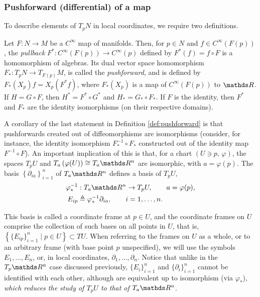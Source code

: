\subsubsection{Pushforward (differential) of a map}
To describe elements of $T_pN$ in local coordinates, we require two definitions.

\begin{defn}\label{def:pushforward}
Let $F:N\rightarrow M$ be a $C^{\infty}$ map of manifolds. Then, for $p\in N$ and $f\in C^{\infty}(F(p))$, the \textit{pullback} $F^*:C^{\infty}(F(p))\rightarrow C^{\infty}(p)$ defined by $F^*(f) = f\circ F$ is a homomorphism of algebras. Its dual vector space homomorphism $F_*:T_pN \rightarrow T_{F(p)}M$, is called the \textit{pushforward}, and is defined by $F_*(X_p)f = X_p(F^*f)$, where $F_*(X_p)$ is a map of $C^{\infty}(F(p))$ to $\R$. If $H = G\circ F$, then $H^* = F^* \circ G^*$ and $H_* = G_* \circ F_*$. If $F$ is the identity, then $F^*$ and $F_*$ are the identity isomorphisms (on their respective domains). 
\end{defn}

A corollary of the last statement in Definition \ref{def:pushforward} is that pushforwards created out of diffeomorphisms are isomorphisms (consider, for instance, the identity isomorphism $F_*^{-1}\circ F_*$ constructed out of the identity map $F^{-1}\circ F$). An important implication of this is that, for a chart $(U\ni p,\, \varphi)$, the spaces $T_pU$ and $T_{a}\left(\varphi(U)\right) \cong T_{a}\R^n$ are isomorphic, with $a = \varphi(p)$. The basis $ \left\{\partial_{ia}\right\}_{i = 1}^n$ of $T_{a}\R^n$ defines a basis of $T_pU$, 
\begin{equation}
\begin{aligned}
\varphi^{-1}_*&:T_{a}\R^n\rightarrow T_pU, \qquad a = \varphi(p),\\
E_{ip} &\triangleq{} \varphi^{-1}_*\partial_{ia}, \qquad i = 1, \dots, n.
\end{aligned}
\end{equation}


This basis is called a {coordinate frame} at $p\in U$, and the {coordinate frames on $U$} comprise the collection of such bases on all points in $U$, that is, $\left\{ \{E_{ip}\}_{i=1}^n \; \bigr| \;p\in U \right\} \subset TU$. When referring to the frames on $U$ as a whole, or to an arbitrary frame (with base point $p$ unspecified), we will use the symbols $E_1, \dots, E_n$, or, in local coordinates, $\partial_1, \dots, \partial_n$. Notice that unlike in the $T_p\R^n$ case discussed previously, $\{E_{i}\}_{i = 1}^n$ and $\{\partial_{i}\}_{i = 1}^n$ cannot be {identified} with each other, although are equivalent up to isomorphism (via $\varphi_*$), \textit{which reduces the study of $T_pU$ to that of $T_{a}\R^n$}. 


